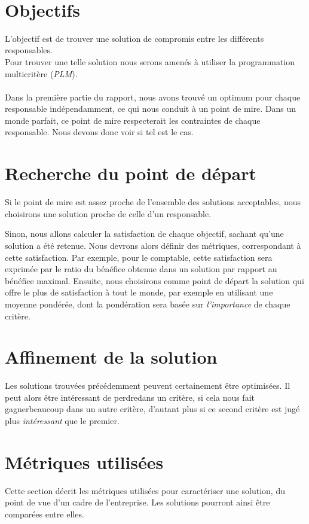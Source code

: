 ~\newpage
{}

\section{Objectifs}
L'objectif est de trouver une solution de compromis entre les différents responsables.\\
Pour trouver une telle solution nous serons amenés à utiliser la programmation multicritère (\emph{PLM}).\\
~\\
Dans la première partie du rapport, nous avons trouvé un optimum pour chaque
responsable indépendam\-ment, ce qui nous conduit à un point de mire. Dans un
monde parfait, ce point de mire respecterait les contraintes de chaque
responsable. Nous devons donc voir si tel est le cas. 

\section{Recherche du point de départ}
Si le point de mire est assez proche de l'ensemble des solutions acceptables,
nous choisirons une solution proche de celle d'un responsable.

Sinon, nous allons calculer la satisfaction de chaque objectif, sachant qu'une
solution a été retenue. Nous devrons alors définir des métriques, correspondant
à cette satisfaction. Par exemple, pour le comptable, cette satisfaction sera
exprimée par le ratio du bénéfice obtenue dans un solution par rapport au
bénéfice maximal.
Ensuite, nous choisirons comme point de départ la solution qui offre le plus de
satisfaction à tout le monde, par exemple en utilisant une moyenne pondérée,
dont la pondération sera basée sur \emph{l'importance} de chaque critère.

\section{Affinement de la solution}
Les solutions trouvées précédemment peuvent certainement être optimisées. Il peut alors être
intéressant de \fg perdre\og dans un critère, si cela nous fait \og gagner\fg beaucoup dans
un autre critère, d'autant plus si ce second critère est jugé plus
\emph{intéressant} que le premier.

\section{Métriques utilisées}
Cette section décrit les métriques utilisées pour caractériser une solution, du
point de vue d'un cadre de l'entreprise. Les solutions pourront ainsi être
comparées entre elles.

